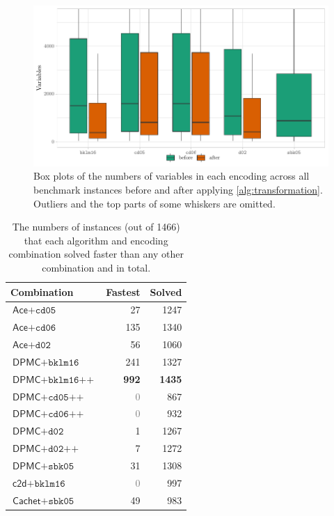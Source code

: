 \begin{figure}
  \centering
  \includegraphics[width=\textwidth]{chapters/wmc_without_parameters/box}
  \caption{Box plots of the numbers of variables in each encoding across all
    benchmark instances before and after applying \cref{alg:transformation}.
    Outliers and the top parts of some whiskers are omitted.}\label{fig:box}
\end{figure}

\begin{table}
  \centering
  \begin{tabular}{lrr}
    \toprule
    Combination & Fastest & Solved \\
    \midrule
    $\textsf{Ace} + \texttt{cd05}$ & 27 & 1247 \\
    $\textsf{Ace} + \texttt{cd06}$ & 135 & 1340 \\
    $\textsf{Ace} + \texttt{d02}$ & 56 & 1060 \\
    $\textsf{DPMC} + \texttt{bklm16}$ & 241 & 1327 \\
    $\textsf{DPMC} + \texttt{bklm16++}$ & \textbf{992} & \textbf{1435} \\
    $\textsf{DPMC} + \texttt{cd05++}$ & \textcolor{gray}{0} & 867 \\
    $\textsf{DPMC} + \texttt{cd06++}$ & \textcolor{gray}{0} & 932 \\
    $\textsf{DPMC} + \texttt{d02}$ & 1 & 1267 \\
    $\textsf{DPMC} + \texttt{d02++}$ & 7 & 1272 \\
    $\textsf{DPMC} + \texttt{sbk05}$ & 31 & 1308 \\
    $\textsf{c2d} + \texttt{bklm16}$ & \textcolor{gray}{0} & 997 \\
    $\textsf{Cachet} + \texttt{sbk05}$ & 49 & 983 \\
    \bottomrule
  \end{tabular}
  \caption{The numbers of instances (out of 1466) that each algorithm and
    encoding combination solved faster than any other combination and in
    total.}\label{tbl:performance}
\end{table}

